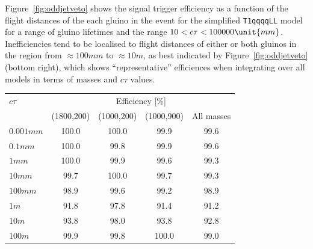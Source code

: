 Figure~\ref{fig:oddjetveto} shows the signal trigger efficiency as a
function of the flight distances of the each gluino in the event for
the simplified \texttt{T1qqqqLL} model for a range of gluino lifetimes
and the range $10 < \ctau < 100000\unit{mm}$. Inefficiencies tend to
be localised to flight distances of either or both gluinos in the
region from ${\approx}100\unit{mm}$ to ${\approx}10\unit{m}$, as best
indicated by Figure~\ref{fig:oddjetveto} (bottom right), which shows
``representative'' efficiences when integrating over all models in
terms of masses and $c\tau$ values.

\begin{table}[h!]
\centering
  \begin{tabular}{lcccc} 
    \hline
    $c\tau$          & \multicolumn{4}{c}{Efficiency [\%]}               \\
    \cline{2-5}
                     & (1800,200) & (1000,200) & (1000,900) & All masses \\
    \hline
    $0.001\unit{mm}$ & 100.0      & 100.0      & 99.9       & 99.6       \\
    $0.1\unit{mm}$   & 100.0      & 99.8       & 99.9       & 99.6       \\
    $1\unit{mm}$     & 100.0      & 99.9       & 99.6       & 99.3       \\
    $10\unit{mm}$    & 99.7       & 100.0      & 99.7       & 99.3       \\
    $100\unit{mm}$   & 98.9       & 99.6       & 99.2       & 98.9       \\
    $1\unit{m}$      & 91.8       & 97.8       & 91.4       & 91.2       \\
    $10\unit{m}$     & 93.8       & 98.0       & 93.8       & 92.8       \\
    $100\unit{m}$    & 99.9       & 99.8       & 100.0      & 99.0       \\
    \hline
  \end{tabular}
  \label{tab:LLP-oddjetveto}
\end{table}

